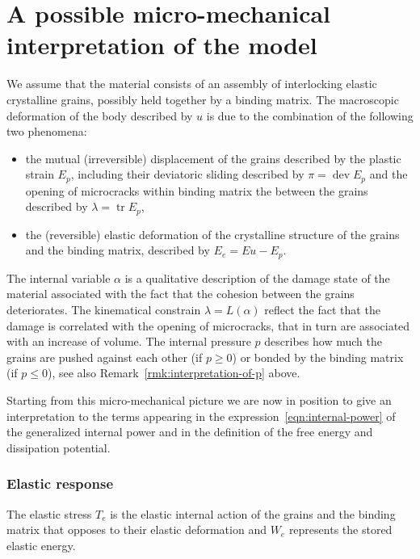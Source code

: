 \documentclass[a4paper,10pt,oneside]{amsbook}
\numberwithin{section}{chapter}
\numberwithin{equation}{chapter}
\theoremstyle{definition}
\DeclareMathOperator{\dev}{dev}
\DeclareMathOperator{\tr}{tr}
\begin{document}
\section{A possible micro-mechanical interpretation of the model}
\label{sec:micro-mechanical}

We assume that the material consists of an assembly of interlocking elastic crystalline grains, possibly held together by a binding matrix. The macroscopic deformation of the body described by $u$ is due to the combination of the following two phenomena:
\begin{itemize}
\item[(i)] the mutual (irreversible) displacement of the grains described by the plastic strain $E_p$, including their deviatoric sliding described by $\pi=\dev E_p$ and the opening of microcracks within binding matrix the between the grains described by $\lambda=\tr E_p$,
\item[(ii)] the (reversible) elastic deformation of the crystalline structure of the grains and the binding matrix, described by $E_e=Eu-E_p$.
\end{itemize}
The internal variable $\alpha$ is a qualitative description of the damage state of the material associated with the fact that the cohesion between the grains deteriorates. The kinematical constrain $\lambda=L(\alpha)$ reflect the fact that the damage is correlated with the opening of microcracks, that in turn are associated with an increase of volume. The internal pressure $p$ describes how much the grains are pushed against each other (if $p\ge0$) or bonded by the binding matrix (if $p\le0$), see also Remark~\ref{rmk:interpretation-of-p} above.

Starting from this micro-mechanical picture we are now in position to give an interpretation to the terms appearing in the expression~\eqref{eqn:internal-power} of the generalized internal power and in the definition of the free energy and dissipation potential.

\subsubsection*{Elastic response} The elastic stress $T_e$ is the elastic internal action of the grains and the binding matrix that opposes to their elastic deformation and $W_e$ represents the stored elastic energy.
\end{document}
